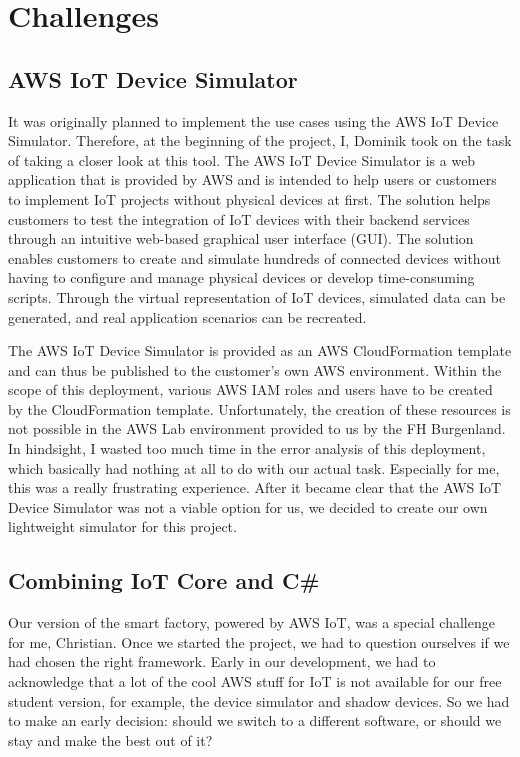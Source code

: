 \chapter{Challenges}

\section{AWS IoT Device Simulator}

It was originally planned to implement the use cases using the AWS IoT Device Simulator.
Therefore, at the beginning of the project, I, Dominik took on the task of taking a closer look at this tool.
The AWS IoT Device Simulator is a web application that is provided by AWS and is intended to help users or customers to implement IoT projects without physical devices at first. 
The solution helps customers to test the integration of IoT devices with their backend services through an intuitive web-based graphical user interface (GUI).
The solution enables customers to create and simulate hundreds of connected devices without having to configure and manage physical devices or develop time-consuming scripts.
Through the virtual representation of IoT devices, simulated data can be generated, and real application scenarios can be recreated.

The AWS IoT Device Simulator is provided as an AWS CloudFormation template and can thus be published to the customer's own AWS environment.
Within the scope of this deployment, various AWS IAM roles and users have to be created by the CloudFormation template.
Unfortunately, the creation of these resources is not possible in the AWS Lab environment provided to us by the FH Burgenland.
In hindsight, I wasted too much time in the error analysis of this deployment, which basically had nothing at all to do with our actual task.
Especially for me, this was a really frustrating experience.
After it became clear that the AWS IoT Device Simulator was not a viable option for us, we decided to create our own lightweight simulator for this project.

\section{Combining IoT Core and C\#}

Our version of the smart factory, powered by AWS IoT, was a special challenge for me, Christian.
Once we started the project, we had to question ourselves if we had chosen the right framework.
Early in our development, we had to acknowledge that a lot of the cool AWS stuff for IoT is not available for our free student version, for example, the device simulator and shadow devices.
So we had to make an early decision: should we switch to a different software, or should we stay and make the best out of it?


